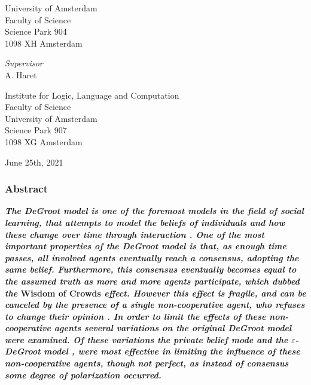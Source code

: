 \documentclass[a4paper, 12pt]{report}
\newcommand{\theSupervisor}{A. Haret} %
\newcommand{\theInstitute}{
Institute for Logic, Language and Computation\\ %
Faculty of Science\\
University of Amsterdam\\
Science Park 907 \\ %
1098 XG Amsterdam %
}
\newcommand{\theDate}{June 25th, 2021}
\begin{document}
\begin{center}
University of Amsterdam\\
Faculty of Science\\
Science Park 904\\
1098 XH Amsterdam

\vspace{2cm}

\emph{Supervisor}\\

\theSupervisor

\vspace{0.25cm}

\theInstitute

\vspace{1.0cm}

\theDate

\end{center}
\newpage

\thispagestyle{empty}

\tableofcontents

\thispagestyle{empty}


\newpage
\thispagestyle{empty}
\subsubsection{Abstract}

\noindent \textbf{\textit{The DeGroot model \parencite{degroot1974concensus} is one of the foremost models in the field of social learning, that attempts to model the beliefs of individuals and how these change over time through interaction \parencite{reed2010sociallearning}. One of the most important properties of the DeGroot model is that, as enough time passes, all involved agents eventually reach a consensus, adopting the same belief. Furthermore, this consensus eventually becomes equal to the assumed truth as more and more agents participate, which \cite{golub2010naive} dubbed the} Wisdom of Crowds \textit{effect. However this effect is fragile, and can be canceled by the presence of a single non-cooperative agent, who refuses to change their opinion \cite{amir2021robust}. In order to limit the effects of these non-cooperative agents several variations on the original DeGroot model were examined. Of these variations the private belief mode \parencite{friedkin1990private} and the $\varepsilon$-DeGroot model \parencite{amir2021robust}, were most effective in limiting the influence of these non-cooperative agents, though not perfect, as instead of consensus some degree of polarization occurred.}} 
\end{document}
